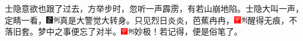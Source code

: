 士隐意欲也跟了过去，方举步时，忽听一声霹雳，有若山崩地陷。士隐大叫一声，定睛一看，{\includegraphics[width=3mm]{../Images/00006}\includegraphics[width=3mm]{../Images/00011}\footnotesize 真是大警觉大转身。}只见烈日炎炎，芭蕉冉冉，{\includegraphics[width=3mm]{../Images/00002}\includegraphics[width=3mm]{../Images/00011}\footnotesize 醒得无痕，不落旧套。}梦中之事便忘了对半。{\includegraphics[width=3mm]{../Images/00002}\includegraphics[width=3mm]{../Images/00011}\footnotesize 妙极！若记得，便是俗笔了。}

